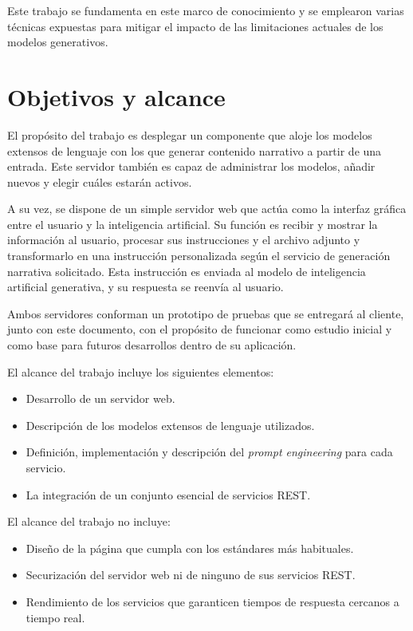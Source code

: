 Este trabajo se fundamenta en este marco de conocimiento
y se emplearon varias técnicas expuestas para mitigar el impacto de las
limitaciones actuales de los modelos generativos.


\section{Objetivos y alcance}
El propósito del trabajo es desplegar un componente que aloje los modelos extensos de lenguaje
con los que generar contenido narrativo a partir de una entrada.
Este servidor también es capaz de administrar los modelos, añadir nuevos y elegir cuáles estarán activos.

A su vez, se dispone de un simple servidor web que actúa como la interfaz gráfica entre el usuario y
la inteligencia artificial. Su función es recibir y mostrar la información al usuario,
procesar sus instrucciones y el archivo adjunto
y transformarlo en una instrucción personalizada según el servicio de generación narrativa solicitado.
Esta instrucción es enviada al modelo de inteligencia artificial generativa, y su respuesta se reenvía al usuario.

Ambos servidores conforman un prototipo de pruebas que se entregará al cliente,
junto con este documento, con el propósito de funcionar como estudio inicial y
como base para futuros desarrollos dentro de su aplicación.

El alcance del trabajo incluye los siguientes elementos:
\begin{itemize}
	\item Desarrollo de un servidor web.
	\item Descripción de los modelos extensos de lenguaje utilizados.
	\item Definición, implementación y descripción del \textit{prompt engineering} para cada servicio.
	\item La integración de un conjunto esencial de servicios REST.
\end{itemize}

El alcance del trabajo no incluye:
\begin{itemize}
	\item Diseño de la página que cumpla con los estándares más habituales.
	\item Securización del servidor web ni de ninguno de sus servicios REST.
	\item Rendimiento de los servicios que garanticen tiempos de respuesta cercanos a tiempo real.
\end{itemize}
